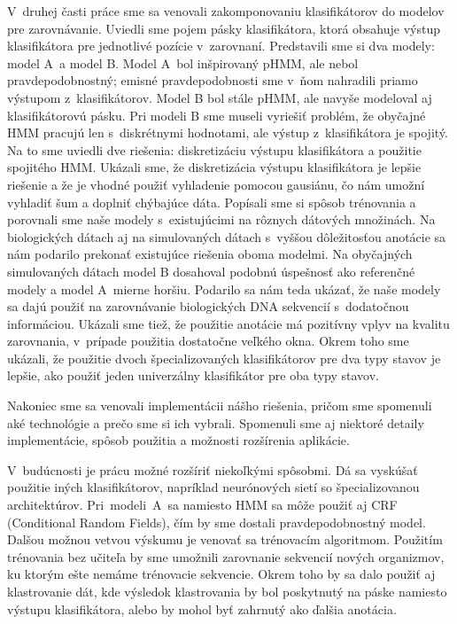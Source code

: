 V~druhej časti práce sme sa venovali zakomponovaniu klasifikátorov do modelov pre zarovnávanie. Uviedli sme pojem pásky klasifikátora, ktorá obsahuje výstup klasifikátora pre jednotlivé pozície v~zarovnaní. Predstavili sme si dva modely: model A~a model B.
Model A~bol inšpirovaný pHMM, ale nebol pravdepodobnostný; emisné pravdepodobnosti sme v~ňom nahradili priamo výstupom z~klasifikátorov.
Model B bol stále pHMM, ale navyše modeloval aj klasifikátorovú pásku.
Pri modeli B sme museli vyriešiť problém, že obyčajné HMM pracujú len s~diskrétnymi hodnotami, ale výstup z~klasifikátora je spojitý. Na to sme uviedli dve riešenia: diskretizáciu výstupu klasifikátora a použitie spojitého HMM.
Ukázali sme, že diskretizácia výstupu klasifikátora je lepšie riešenie a že je vhodné použiť vyhladenie pomocou gausiánu, čo nám umožní vyhladiť šum a doplniť chýbajúce dáta. Popísali sme si spôsob trénovania a porovnali sme naše modely s~existujúcimi na rôznych dátových množinách.
Na biologických dátach aj na simulovaných dátach s~vyššou dôležitosťou anotácie sa nám podarilo prekonať existujúce riešenia oboma modelmi. Na obyčajných simulovaných dátach model B dosahoval podobnú úspešnosť ako referenčné modely a model A~mierne horšiu. Podarilo sa nám teda ukázať, že naše modely sa dajú použiť na zarovnávanie biologických DNA sekvencií s~dodatočnou informáciou. Ukázali sme tiež, že použitie anotácie má pozitívny vplyv na kvalitu zarovnania, v~prípade použitia dostatočne veľkého okna. Okrem toho sme ukázali, že použitie dvoch špecializovaných klasifikátorov pre dva typy stavov je lepšie, ako použiť jeden univerzálny klasifikátor pre oba typy stavov.

Nakoniec sme sa venovali implementácii nášho riešenia, pričom sme spomenuli aké technológie a prečo sme si ich vybrali. Spomenuli sme aj niektoré detaily implementácie, spôsob použitia a možnosti rozšírenia aplikácie.

V~budúcnosti je prácu možné rozšíriť niekoľkými spôsobmi. Dá sa vyskúšať použitie iných klasifikátorov, napríklad neurónových sietí so špecializovanou architektúrov. Pri~modeli~A~sa namiesto HMM sa môže použiť aj CRF (Conditional Random Fields), čím by sme dostali pravdepodobnostný model.
Dalšou možnou vetvou výskumu je venovať sa trénovacím algoritmom. Použitím trénovania bez učiteľa by sme umožnili zarovnanie sekvencií nových organizmov, ku ktorým ešte nemáme trénovacie sekvencie. Okrem toho by sa dalo použiť aj klastrovanie dát, kde výsledok klastrovania by bol poskytnutý na páske namiesto výstupu klasifikátora, alebo by mohol byť zahrnutý ako ďalšia anotácia.
